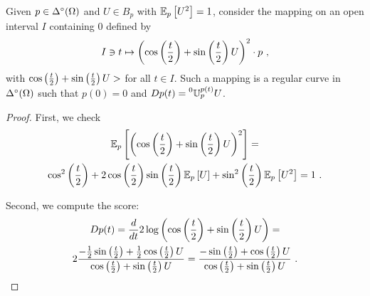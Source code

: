 \documentclass[12pt,a4paper]{amsart}
\begin{document}
  \begin{proposition}
    Given $p \in \Delta^\circ(\Omega)$ and $U \in B_p$ with ${\operatorname{\mathbb E}}_{p}\left[U^2\right] = 1$, consider the mapping on an open interval $I$ containing 0 defined by 
%
    \begin{equation*}
      I \ni t \mapsto \left(\cos\left(\frac t2\right)+\sin\left(\frac t2\right) U\right)^2 \cdot p \ ,
    \end{equation*}
with $\cos\left(\frac t2\right)+\sin\left(\frac t2\right) U >$ for all $t \in I$. Such a mapping is a regular curve in $\Delta^\circ(\Omega)$ such that $p(0) = 0$ and $Dp(t) = \prescript{0}{}{\mathbb U}_{p}^{p(t)} U$.
  \end{proposition}
%
  \begin{proof}
    First, we check
%
    \begin{multline*}
      {\operatorname{\mathbb E}}_{p}\left[\left(\cos\left(\frac t2\right)+\sin\left(\frac t2\right) U\right)^2\right] = \\ \cos^2\left(\frac t2\right) + 2 \cos\left(\frac t2\right) \sin\left(\frac t2\right) {\operatorname{\mathbb E}}_{p}\left[U\right] + \sin^2\left(\frac t2\right) {\operatorname{\mathbb E}}_{p}\left[U^2\right] = 1 \ . 
    \end{multline*}

Second, we compute the score:
%
\begin{multline*}
  Dp(t) = \frac{d}{dt} 2 \log\left( \cos\left(\frac t2\right)+\sin\left(\frac t2\right) U \right) = \\
2 \frac{-\frac12 \sin\left(\frac t2\right) + \frac12 \cos\left(\frac t2\right)U}{\cos\left(\frac t2\right)+\sin\left(\frac t2\right) U} = \frac{- \sin\left(\frac t2\right) + \cos\left(\frac t2\right)U}{\cos\left(\frac t2\right)+\sin\left(\frac t2\right) U} \ .
\end{multline*}


\end{proof}
\end{document}
